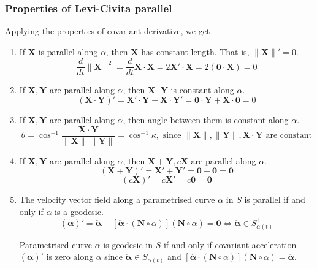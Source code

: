 \subsubsection{Properties of Levi-Civita parallel}
Applying the properties of covariant derivative, we get
\begin{enumerate}
	\item If $\boldsymbol{X}$ is parallel along $\alpha$, then $\boldsymbol{X}$ has constant length.
		That is, $\|\boldsymbol{X}\|' = 0$.
		$$\dfrac{d}{dt} \|\boldsymbol{X}\|^2 = \dfrac{d}{dt} \boldsymbol{X} \cdot \boldsymbol{X} = 2 \boldsymbol{X}' \cdot \boldsymbol{X} = 2(\boldsymbol{0} \cdot \boldsymbol{X}) = 0 $$ 
	\item If $\boldsymbol{X},\boldsymbol{Y}$ are parallel along $\alpha$, then $\boldsymbol{X} \cdot \boldsymbol{Y}$  is constant along $\alpha$.
		\[ (\boldsymbol{X} \cdot \boldsymbol{Y})' = \boldsymbol{X}' \cdot \boldsymbol{Y} + \boldsymbol{X} \cdot \boldsymbol{Y}' = \boldsymbol{0} \cdot \boldsymbol{Y} + \boldsymbol{X} \cdot \boldsymbol{0} = 0 \]
	\item If $\boldsymbol{X},\boldsymbol{Y}$ are parallel along $\alpha$, then angle between them is constant along $\alpha$.
		\[ \theta = \cos^{-1} \frac{\boldsymbol{X} \cdot \boldsymbol{Y}}{\|\boldsymbol{X}\|\ \|\boldsymbol{Y}\|} = \cos^{-1} \kappa, \text{ since } \|\boldsymbol{X} \|, \| \boldsymbol{Y}\|, \boldsymbol{X} \cdot \boldsymbol{Y} \text{ are constant} \]
	\item If $\boldsymbol{X}, \boldsymbol{Y}$ are parallel along $\alpha$, then $\boldsymbol{X}+\boldsymbol{Y}, c\boldsymbol{X}$ are parallel along $\alpha$.
		\[ (\boldsymbol{X}+\boldsymbol{Y})' = \boldsymbol{X}' + \boldsymbol{Y}' = \boldsymbol{0} + \boldsymbol{0} = \boldsymbol{0} \]
		\[ (c\boldsymbol{X})' = c\boldsymbol{X}' = c\boldsymbol{0} = \boldsymbol{0} \]
	\item The velocity vector field along a parametrised curve $\alpha$ in $S$ is parallel if and only if $\alpha$ is a geodesic.
		\[ (\dot{\boldsymbol{\alpha}})' = \ddot{\boldsymbol{\alpha}} - \left[ \ddot{\boldsymbol{\alpha}} \cdot (\boldsymbol{N} \circ \alpha) \right] (\boldsymbol{N} \circ \alpha) = \boldsymbol{0} \iff \ddot{\boldsymbol{\alpha}} \in S_{\alpha(t)}^\perp \]

		Parametrised curve $\alpha$ is geodesic in $S$ if and only if covariant acceleration $(\dot{\boldsymbol{\alpha}})'$ is zero along $\alpha$ since $\ddot{\boldsymbol{\alpha}} \in S_{\alpha(t)}^\perp$ and  $\left[ \ddot{\boldsymbol{\alpha}} \cdot (\boldsymbol{N} \circ \alpha) \right] (\boldsymbol{N} \circ \alpha) = \ddot{\boldsymbol{\alpha}}$.
\end{enumerate}


